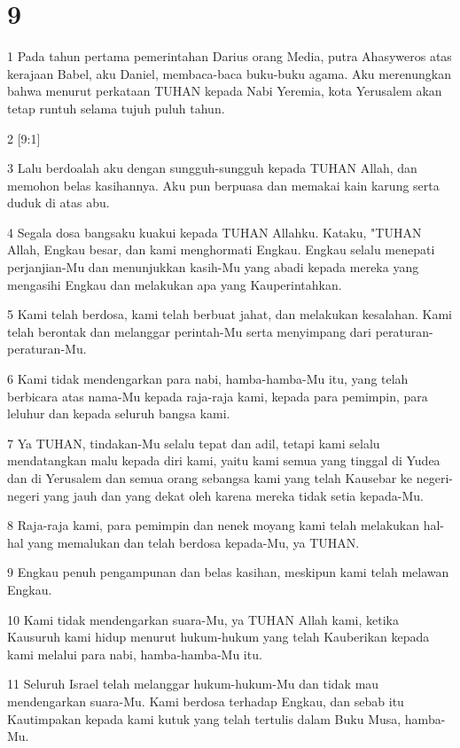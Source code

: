 \chapter{9}

\par 1 Pada tahun pertama pemerintahan Darius orang Media, putra Ahasyweros atas kerajaan Babel, aku Daniel, membaca-baca buku-buku agama. Aku merenungkan bahwa menurut perkataan TUHAN kepada Nabi Yeremia, kota Yerusalem akan tetap runtuh selama tujuh puluh tahun.
\par 2 [9:1]
\par 3 Lalu berdoalah aku dengan sungguh-sungguh kepada TUHAN Allah, dan memohon belas kasihannya. Aku pun berpuasa dan memakai kain karung serta duduk di atas abu.
\par 4 Segala dosa bangsaku kuakui kepada TUHAN Allahku. Kataku, "TUHAN Allah, Engkau besar, dan kami menghormati Engkau. Engkau selalu menepati perjanjian-Mu dan menunjukkan kasih-Mu yang abadi kepada mereka yang mengasihi Engkau dan melakukan apa yang Kauperintahkan.
\par 5 Kami telah berdosa, kami telah berbuat jahat, dan melakukan kesalahan. Kami telah berontak dan melanggar perintah-Mu serta menyimpang dari peraturan-peraturan-Mu.
\par 6 Kami tidak mendengarkan para nabi, hamba-hamba-Mu itu, yang telah berbicara atas nama-Mu kepada raja-raja kami, kepada para pemimpin, para leluhur dan kepada seluruh bangsa kami.
\par 7 Ya TUHAN, tindakan-Mu selalu tepat dan adil, tetapi kami selalu mendatangkan malu kepada diri kami, yaitu kami semua yang tinggal di Yudea dan di Yerusalem dan semua orang sebangsa kami yang telah Kausebar ke negeri-negeri yang jauh dan yang dekat oleh karena mereka tidak setia kepada-Mu.
\par 8 Raja-raja kami, para pemimpin dan nenek moyang kami telah melakukan hal-hal yang memalukan dan telah berdosa kepada-Mu, ya TUHAN.
\par 9 Engkau penuh pengampunan dan belas kasihan, meskipun kami telah melawan Engkau.
\par 10 Kami tidak mendengarkan suara-Mu, ya TUHAN Allah kami, ketika Kausuruh kami hidup menurut hukum-hukum yang telah Kauberikan kepada kami melalui para nabi, hamba-hamba-Mu itu.
\par 11 Seluruh Israel telah melanggar hukum-hukum-Mu dan tidak mau mendengarkan suara-Mu. Kami berdosa terhadap Engkau, dan sebab itu Kautimpakan kepada kami kutuk yang telah tertulis dalam Buku Musa, hamba-Mu.
